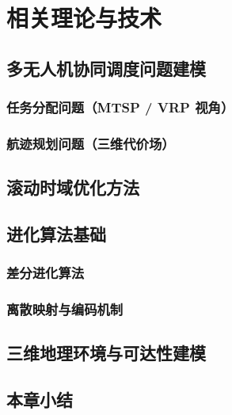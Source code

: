 \chapter{相关理论与技术}

\section{多无人机协同调度问题建模}
\subsection{任务分配问题（MTSP / VRP 视角）}
\subsection{航迹规划问题（三维代价场）}

\section{滚动时域优化方法}

\section{进化算法基础}
\subsection{差分进化算法}
\subsection{离散映射与编码机制}

\section{三维地理环境与可达性建模}

\section{本章小结}
